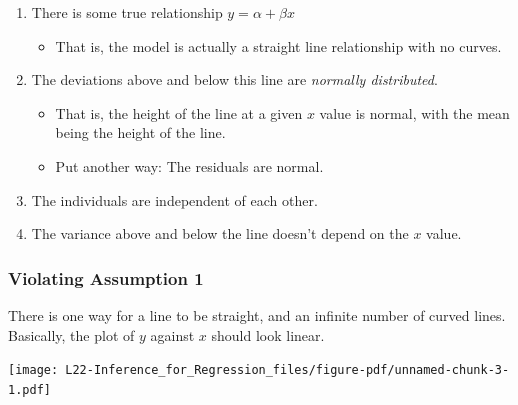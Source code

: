 \documentclass[
  letterpaper,
  DIV=11,
  numbers=noendperiod,
  oneside]{scrreprt}
\providecommand{\tightlist}{%
  \setlength{\itemsep}{0pt}\setlength{\parskip}{0pt}}\usepackage{longtable,booktabs,array}
\begin{document}
\begin{tcolorbox}[enhanced jigsaw, toprule=.15mm, colbacktitle=quarto-callout-note-color!10!white, title=\textcolor{quarto-callout-note-color}{\faInfo}\hspace{0.5em}{Linear Regression Assumptions}, arc=.35mm, colframe=quarto-callout-note-color-frame, colback=white, titlerule=0mm, left=2mm, bottomtitle=1mm, bottomrule=.15mm, breakable, opacitybacktitle=0.6, leftrule=.75mm, toptitle=1mm, coltitle=black, rightrule=.15mm, opacityback=0]

\begin{enumerate}
\def\labelenumi{\arabic{enumi}.}
\tightlist
\item
  There is some true relationship \(y = \alpha + \beta x\)

  \begin{itemize}
  \tightlist
  \item
    That is, the model is actually a straight line relationship with no
    curves.
  \end{itemize}
\item
  The deviations above and below this line are \emph{normally
  distributed}.

  \begin{itemize}
  \tightlist
  \item
    That is, the height of the line at a given \(x\) value is normal,
    with the mean being the height of the line.
  \item
    Put another way: The residuals are normal.
  \end{itemize}
\item
  The individuals are independent of each other.
\item
  The variance above and below the line doesn't depend on the \(x\)
  value.
\end{enumerate}

\end{tcolorbox}

\hypertarget{violating-assumption-1}{%
\subsubsection{Violating Assumption 1}\label{violating-assumption-1}}

There is one way for a line to be straight, and an infinite number of
curved lines. Basically, the plot of \(y\) against \(x\) should look
linear.

\texttt{[image: L22-Inference\_for\_Regression\_files/figure-pdf/unnamed-chunk-3-1.pdf]}
\end{document}
